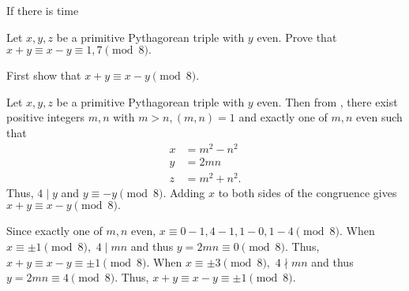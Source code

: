 \documentclass{ximera}
\begin{document}
If there is time

\begin{br}
	Let $x,y,z$ be a primitive Pythagorean triple with $y$ even. Prove that $x+y\equiv x-y\equiv 1,7\pmod{8}.$

	\begin{hint}
		First show that $x+y\equiv x-y\pmod{8}.$
	\end{hint}


	\begin{solution}
		Let $x,y,z$ be a primitive Pythagorean triple with $y$ even. 
		Then from , there exist positive integers $m,n$ with $m>n, (m,n)=1$ and exactly one of $m,n$ even such that 
		\begin{align*}
			x&=m^2-n^2\\
			y&=2mn\\
			z&=m^2+n^2.
		\end{align*}
		Thus, $4\mid y$ and $y\equiv -y\pmod{8}.$ Adding $x$ to both sides of the congruence gives $x+y\equiv x-y\pmod{8}.$

		Since exactly one of $m,n$ even, $x\equiv 0-1, 4-1, 1-0, 1-4\pmod{8}.$ When $x\equiv \pm 1\pmod{8},$ $4\mid mn$ and thus $y=2mn\equiv 0\pmod{8}.$ Thus,
		$x+y\equiv x-y\equiv \pm 1\pmod{8}.$ 
		When $x\equiv \pm 3\pmod{8},$ $4\nmid mn$ and thus $y=2mn\equiv 4\pmod{8}.$ Thus,
		$x+y\equiv x-y\equiv \pm 1\pmod{8}.$ 
	\end{solution}
\end{br}
\end{document}
